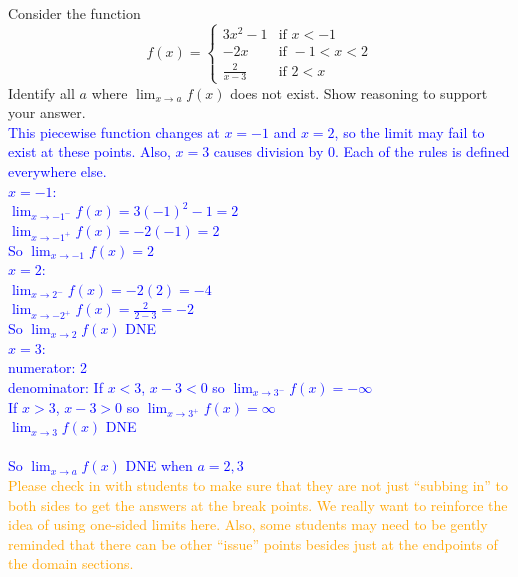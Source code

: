 \documentclass{ximera}
\begin{document}
\begin{exercise}
    Consider the function \[ f(x)=
    \begin{cases}
    3x^2-1 & \text{if }x<-1\\
    -2x & \text{if } -1<x<2\\
    \frac{2}{x-3} &\text{if } 2<x
    \end{cases}\]
    Identify all $a$ where $\displaystyle \lim_{x\rightarrow a} f(x)$ does not exist.  Show reasoning to support your answer.\\
    \textcolor{blue}{ This piecewise function changes at $x=-1$ and $x=2$, so the limit may fail to exist at these points. Also, $x=3$ causes division by 0.  Each of the rules is defined everywhere else.\\
    $x=-1$:\\
    $\displaystyle \lim_{x\rightarrow -1^-} f(x)=3(-1)^2-1=2$\\
    $\displaystyle \lim_{x\rightarrow -1^+} f(x)=-2(-1)=2$\\
    So $\displaystyle \lim_{x\rightarrow-1}f(x)=2$\\
    $x=2$:\\
    $\displaystyle \lim_{x\rightarrow 2^-} f(x)=-2(2)=-4$\\
    $\displaystyle \lim_{x\rightarrow -2^+} f(x)=\frac{2}{2-3}=-2$\\
    So $\displaystyle \lim_{x\rightarrow 2}f(x)$ DNE\\
    $x=3$:\\
    numerator: 2\\
    denominator: If $x<3$, $x-3<0$ so $\displaystyle \lim_{x\rightarrow 3^-} f(x)=-\infty$\\
    If $x>3$, $x-3>0$ so $\displaystyle \lim_{x\rightarrow 3^+}f(x)=\infty$\\
    $\displaystyle \lim_{x\rightarrow 3} f(x)$ DNE\\
    \\
    So $\displaystyle \lim_{x\rightarrow a} f(x)$ DNE when $a=2,3$
    }\\
    \textcolor{orange}{Please check in with students to make sure that they are not just ``subbing in'' to both sides to get the answers at the break points.  We really want to reinforce the idea of using one-sided limits here.  Also, some students may need to be gently reminded that there can be other ``issue'' points besides just at the endpoints of the domain sections.}
\end{exercise}
\end{document}
